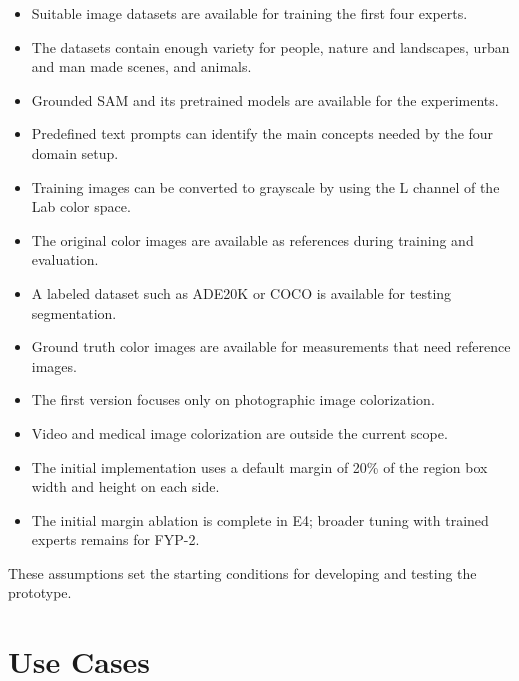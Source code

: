 \documentclass{FastFyp}
\begin{document}
\begin{itemize}
    \item Suitable image datasets are available for training the first four experts.
    
    \item The datasets contain enough variety for people, nature and landscapes, urban and man made scenes, and animals.
    
    \item Grounded SAM and its pretrained models are available for the experiments.
    
    \item Predefined text prompts can identify the main concepts needed by the four domain setup.
    
    \item Training images can be converted to grayscale by using the L channel of the Lab color space.
    
    \item The original color images are available as references during training and evaluation.
    
    \item A labeled dataset such as ADE20K or COCO is available for testing segmentation.
    
    \item Ground truth color images are available for measurements that need reference images.
    
    \item The first version focuses only on photographic image colorization.
    
    \item Video and medical image colorization are outside the current scope.
    
    \item The initial implementation uses a default margin of 20\% of the region box width and height on each side.
    
    \item The initial margin ablation is complete in E4; broader tuning with trained experts remains for FYP-2.
\end{itemize}

These assumptions set the starting conditions for developing and testing the prototype.

\section{Use Cases}
\end{document}
